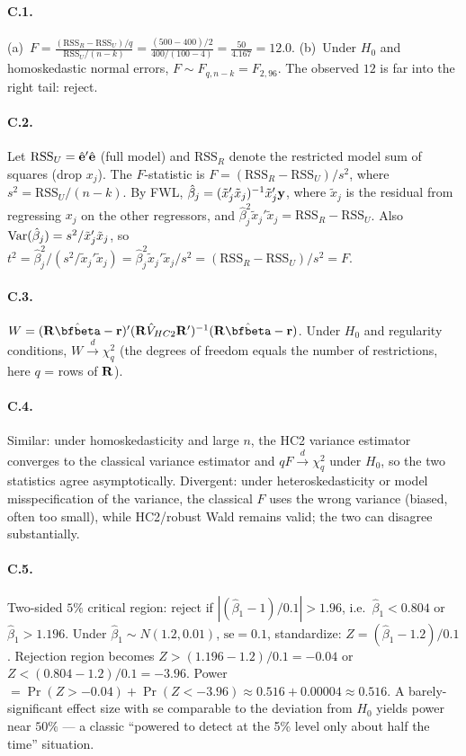 \documentclass{article}
\newcommand{\dconv}{\xrightarrow{d}}
\begin{document}
\bigskip

\paragraph{C.1.}  (a)~$F = \frac{(\text{RSS}_R - \text{RSS}_U)/q}{\text{RSS}_U/(n - k)} = \frac{(500 - 400)/2}{400/(100 - 4)} = \frac{50}{4.167} = 12.0$.  (b)~Under $H_0$ and homoskedastic normal errors, $F \sim F_{q, n-k} = F_{2, 96}$.  The observed $12$ is far into the right tail: reject.

\paragraph{C.2.}  Let $\text{RSS}_U = \hat{{\mathbf e}}'\hat{{\mathbf e}}$ (full model) and $\text{RSS}_R$ denote the restricted model sum of squares (drop $x_j$).  The $F$-statistic is $F = (\text{RSS}_R - \text{RSS}_U)/s^2$, where $s^2 = \text{RSS}_U/(n - k)$.  By FWL, $\hat\beta_j = (\tilde x_j'\tilde x_j)^{-1}\tilde x_j'{\mathbf y}$, where $\tilde x_j$ is the residual from regressing $x_j$ on the other regressors, and $\hat\beta_j^2\tilde x_j'\tilde x_j = \text{RSS}_R - \text{RSS}_U$.  Also $\mbox{Var}(\hat\beta_j) = s^2/\tilde x_j'\tilde x_j$, so $t^2 = \hat\beta_j^2/(s^2/\tilde x_j'\tilde x_j) = \hat\beta_j^2\tilde x_j'\tilde x_j/s^2 = (\text{RSS}_R - \text{RSS}_U)/s^2 = F$.

\paragraph{C.3.}  $W = (\bfR\hat\bfbeta - \bfr)'(\bfR\hat V_{HC2}\bfR')^{-1}(\bfR\hat\bfbeta - \bfr)$.  Under $H_0$ and regularity conditions, $W \dconv \chi^2_q$ (the degrees of freedom equals the number of restrictions, here $q$ = rows of ${\mathbf R}$).

\paragraph{C.4.}  Similar: under homoskedasticity and large $n$, the HC2 variance estimator converges to the classical variance estimator and $q F \dconv \chi^2_q$ under $H_0$, so the two statistics agree asymptotically.  Divergent: under heteroskedasticity or model misspecification of the variance, the classical $F$ uses the wrong variance (biased, often too small), while HC2/robust Wald remains valid; the two can disagree substantially.

\paragraph{C.5.}  Two-sided $5\%$ critical region: reject if $|(\hat\beta_1 - 1)/0.1| > 1.96$, i.e.\ $\hat\beta_1 < 0.804$ or $\hat\beta_1 > 1.196$.  Under $\hat\beta_1 \sim N(1.2, 0.01)$, $\text{se} = 0.1$, standardize: $Z = (\hat\beta_1 - 1.2)/0.1$.  Rejection region becomes $Z > (1.196 - 1.2)/0.1 = -0.04$ or $Z < (0.804 - 1.2)/0.1 = -3.96$.  Power $= \Pr(Z > -0.04) + \Pr(Z < -3.96) \approx 0.516 + 0.00004 \approx 0.516$.  A barely-significant effect size with se comparable to the deviation from $H_0$ yields power near $50\%$ --- a classic ``powered to detect at the 5\% level only about half the time'' situation.
\end{document}
